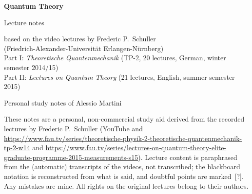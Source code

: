 \documentclass[12pt,oneside,openany]{book}
\begin{document}
\frontmatter
\begin{titlepage}
  \centering
  \vspace*{3cm}
  {\Huge\bfseries Quantum Theory\par}
  \vspace{1cm}
  {\Large Lecture notes\par}
  \vspace{0.5cm}
  {\large based on the video lectures by Frederic P.~Schuller\\
  (Friedrich-Alexander-Universit\"at Erlangen-N\"urnberg)\\
  Part I: \emph{Theoretische Quantenmechanik} (TP-2, 20 lectures, German, winter semester 2014/15)\\Part II: \emph{Lectures on Quantum Theory} (21 lectures, English, summer semester 2015)\par}
  \vspace{2cm}
  {\large Personal study notes of Alessio Martini\par}
  \vfill
  \begin{minipage}{0.85\textwidth}\small
    These notes are a personal, non-commercial study aid derived from the recorded lectures by Frederic P.~Schuller
    (YouTube and \url{https://www.fau.tv/series/theoretische-physik-2-theoretische-quantenmechanik-tp-2-w14} and \url{https://www.fau.tv/series/lectures-on-quantum-theory-elite-graduate-programme-2015-measurements-s15}).
    Lecture content is paraphrased from the (automatic) transcripts of the videos, not transcribed;
    the blackboard notation is reconstructed from what is said, and doubtful points are marked~[?].
    Any mistakes are mine. All rights on the original lectures belong to their authors.
  \end{minipage}
  \vspace{1cm}
\end{titlepage}
\end{document}

